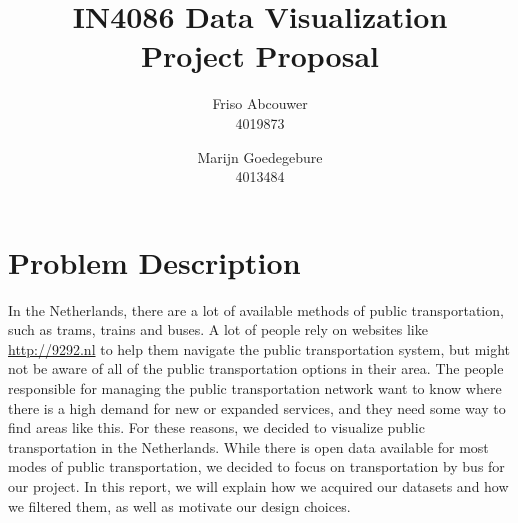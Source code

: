 \documentclass[a4paper,11pt]{article}
\title{IN4086 Data Visualization \\
Project Proposal \\ }
\author{
Friso Abcouwer \\
4019873 \\
\and
Marijn Goedegebure \\
4013484
}
\begin{document}
\maketitle{}
\newpage

\section{Problem Description}
In the Netherlands, there are a lot of available methods of public transportation, such as trams, trains and buses.
A lot of people rely on websites like \url{http://9292.nl} to help them navigate the public transportation system, but might not be aware of all of the public transportation options in their area. The people responsible for managing the public transportation network want to know where there is a high demand for new or expanded services, and they need some way to find areas like this.
For these reasons, we decided to visualize public transportation in the Netherlands. While there is open data available for most modes of public transportation, we decided to focus on transportation by bus for our project. In this report, we will explain how we acquired our datasets and how we filtered them, as well as motivate our design choices.  
\end{document}
